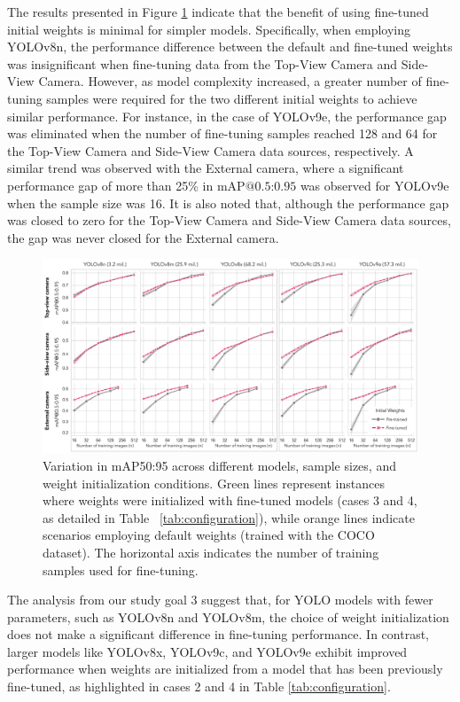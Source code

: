 The results presented in Figure \ref{fig:finetune} indicate that the benefit of using fine-tuned initial weights is minimal for simpler models. Specifically, when employing YOLOv8n, the performance difference between the default and fine-tuned weights was insignificant when fine-tuning data from the Top-View Camera and Side-View Camera. However, as model complexity increased, a greater number of fine-tuning samples were required for the two different initial weights to achieve similar performance. For instance, in the case of YOLOv9e, the performance gap was eliminated when the number of fine-tuning samples reached 128 and 64 for the Top-View Camera and Side-View Camera data sources, respectively. A similar trend was observed with the External camera, where a significant performance gap of more than 25\% in $\text{mAP@{0.5:0.95}}$ was observed for YOLOv9e when the sample size was 16. It is also noted that, although the performance gap was closed to zero for the Top-View Camera and Side-View Camera data sources, the gap was never closed for the External camera. 
\begin{figure}[h]
    \centering
    \includegraphics[width=1\textwidth]{figure_5.jpg}
    \caption{Variation in mAP50:95 across different models, sample sizes, and weight initialization conditions. Green lines represent instances where weights were initialized with fine-tuned models (cases 3 and 4, as detailed in Table ~\ref{tab:configuration}), while orange lines indicate scenarios employing default weights (trained with the COCO dataset). The horizontal axis indicates the number of training samples used for fine-tuning.}
    \label{fig:finetune}
\end{figure}


The analysis from our study goal 3 suggest that, for YOLO models with fewer parameters, such as YOLOv8n and YOLOv8m, the choice of weight initialization does not make a significant difference in fine-tuning performance. In contrast, larger models like YOLOv8x, YOLOv9c, and YOLOv9e exhibit improved performance when weights are initialized from a model that has been previously fine-tuned, as highlighted in cases 2 and 4 in Table \ref{tab:configuration}.

